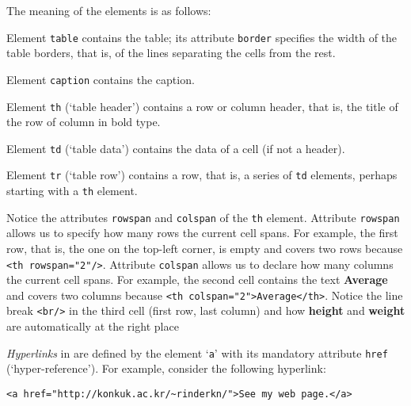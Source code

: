 The meaning of the elements is as follows:
\begin{itemize*}

  \item Element \texttt{table} contains the table; its attribute
  \texttt{border} specifies the width of the table borders, that is,
  of the lines separating the cells from the rest.

  \item Element \texttt{caption} contains the caption.

  \item Element \texttt{th} (`table header') contains a row or column
    header, that is, the title of the row of column in bold type.

  \item Element \texttt{td} (`table data') contains the data of a
    cell (if not a header).

  \item Element \texttt{tr} (`table row') contains a row, that is, a
    series of \texttt{td} elements, perhaps starting with a
    \texttt{th} element.

\end{itemize*}
Notice the attributes \texttt{rowspan} and \texttt{colspan} of the
\texttt{th} element. Attribute \texttt{rowspan} allows us to specify
how many rows the current cell spans. For example, the first row, that
is, the one on the top\hyp{}left corner, is empty and covers two rows
because \verb|<th rowspan="2"/>|. Attribute \texttt{colspan} allows us
to declare how many columns the current cell spans. For example, the
second cell contains the text \textbf{Average} and covers two columns
because \verb|<th colspan="2">Average</th>|. Notice the line break
\verb|<br/>| in the third cell (first row, last column) and how
\textbf{height} and \textbf{weight} are automatically at the right
place

\emph{Hyperlinks} in \HTML are defined by the element `\texttt{a}'
with its mandatory attribute \texttt{href}
(`hyper\hyp{}reference'). For example, consider the following
hyperlink:
\begin{verbatim}
<a href="http://konkuk.ac.kr/~rinderkn/">See my web page.</a>
\end{verbatim}

\mypar{\XHTML}


